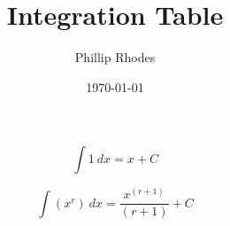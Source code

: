 \documentclass[fleqn]{article} %
\title{Integration Table} %
\author{Phillip Rhodes} %
\date{\today} %
\begin{document}
    \maketitle %
    
    \begin{equation} %
      \int 1 \:dx = x + C
    \end{equation}

    \begin{equation} %
      \int (x^r)\:dx =  \frac{ x^{(r+1)} }{(r+1)} + C
    \end{equation}
\end{document}
